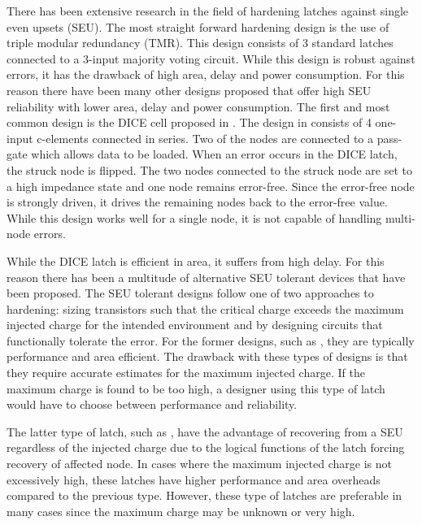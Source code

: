 There has been extensive research in the field of hardening latches against single even upsets (SEU). The most straight forward hardening design is the use of triple modular redundancy (TMR). This design consists of 3 standard latches connected to a 3-input majority voting circuit. While this design is robust against errors, it has the drawback of high area, delay and power consumption. For this reason there have been many other designs proposed that offer high SEU reliability with lower area, delay and power consumption. The first and most common design is the DICE cell proposed in \cite{DICE}. The design in \cite{DICE} consists of 4 one-input c-elements connected in series. Two of the nodes are connected to a pass-gate which allows data to be loaded. When an error occurs in the DICE latch, the struck node is flipped. The two nodes connected to the struck node are set to a high impedance state and one node remains error-free. Since the error-free node is strongly driven, it drives the remaining nodes back to the error-free value. While this design works well for a single node, it is not capable of handling multi-node errors. 

While the DICE latch is efficient in area, it suffers from high delay. For this reason there has been a multitude of alternative SEU tolerant devices that have been proposed. The SEU tolerant designs follow one of two approaches to hardening: sizing transistors such that the critical charge exceeds the maximum injected charge for the intended environment and by designing circuits that functionally tolerate the error. For the former designs, such as \cite{NicoFeedback}, they are typically performance and area efficient. The drawback with these types of designs is that they require accurate estimates for the maximum injected charge. If the maximum charge is found to be too high, a designer using this type of latch would have to choose between performance and reliability. 

The latter type of latch, such as \cite{HIPER, FERST, Hazucha, SEMULatch, Multivdd, BISER}, have the advantage of recovering from a SEU regardless of the injected charge due to the logical functions of the latch forcing recovery of affected node. In cases where the maximum injected charge is not excessively high, these latches have higher performance and area overheads compared to the previous type. However, these type of latches are preferable in many cases since the maximum charge may be unknown or very high. 


